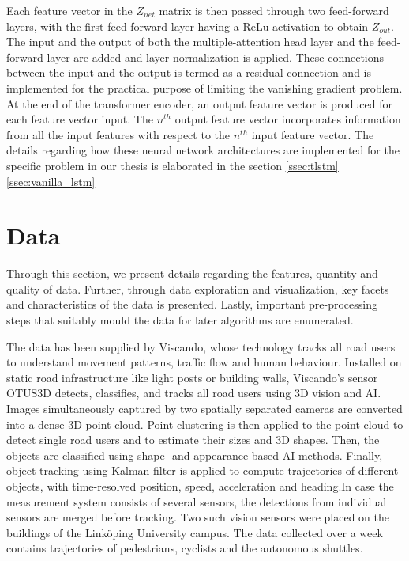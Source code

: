 \documentclass{article}
\begin{document}
Each feature vector in the $Z_{net}$ matrix is then passed through two feed-forward layers, with the first feed-forward layer having a ReLu activation to obtain $Z_{out}$. The input and the output of both the multiple-attention head layer and the feed-forward layer are added and layer normalization is applied. These connections between the input and the output is termed as a residual connection and is implemented for the practical purpose of limiting the vanishing gradient problem. At the end of the transformer encoder, an output feature vector is produced for each feature vector input. The $n^{th}$ output feature vector incorporates information from all the input features with respect to the $n^{th}$ input feature vector. The details regarding how these neural network architectures are implemented for the specific problem in our thesis is elaborated in the section \ref{ssec:tlstm}\ref{ssec:vanilla_lstm} 

\section{Data}
Through this section, we present details regarding the features, quantity and quality of data. Further, through data exploration and visualization, key facets and characteristics of the data is presented. Lastly, important pre-processing steps that suitably mould the data for later algorithms are enumerated. 

The data has been supplied by Viscando, whose technology tracks all road users to understand movement patterns, traffic flow and human behaviour. Installed on static road infrastructure like light posts or building walls, Viscando’s sensor OTUS3D detects, classifies, and tracks all road users using 3D vision and AI. Images simultaneously captured by two spatially separated cameras are converted into a dense 3D point cloud. Point clustering is then applied to the point cloud to detect single road users and to estimate their sizes and 3D shapes. Then, the objects are classified using shape- and appearance-based AI methods. Finally, object tracking using Kalman filter is applied to compute trajectories of different objects, with time-resolved position, speed, acceleration and heading.In case the measurement system consists of several sensors, the detections from individual sensors are merged before tracking. Two such vision sensors were placed on the buildings of the Link\"{o}ping University campus. The data collected over a week contains trajectories of pedestrians, cyclists and the autonomous shuttles. 
\end{document}
